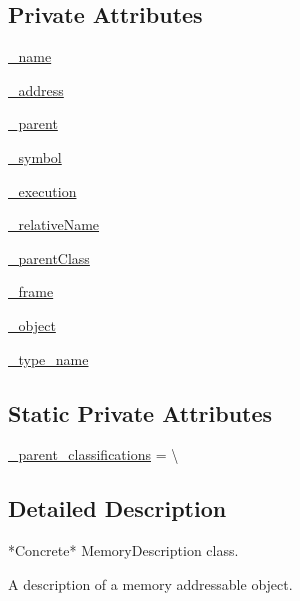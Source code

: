 \subsection*{Private Attributes}
\begin{DoxyCompactItemize}
\item 
\hyperlink{classmemoryoracle_1_1descriptions_1_1MemoryDescription_a230aae12304394f735d52002227c7705}{\+\_\+name}
\item 
\hyperlink{classmemoryoracle_1_1descriptions_1_1MemoryDescription_a06750833f49f1de99914f927c534d997}{\+\_\+address}
\item 
\hyperlink{classmemoryoracle_1_1descriptions_1_1MemoryDescription_a1ac34a11871a96eeff4f8285e0ad3a66}{\+\_\+parent}
\item 
\hyperlink{classmemoryoracle_1_1descriptions_1_1MemoryDescription_a6857ccb0a28dc478c8da23457b55f7d7}{\+\_\+symbol}
\item 
\hyperlink{classmemoryoracle_1_1descriptions_1_1MemoryDescription_ae48342721625d8c170df2c5dd2d73ec3}{\+\_\+execution}
\item 
\hyperlink{classmemoryoracle_1_1descriptions_1_1MemoryDescription_aabeba1644723470428b1aeb30a20e554}{\+\_\+relative\+Name}
\item 
\hyperlink{classmemoryoracle_1_1descriptions_1_1MemoryDescription_a56f034c13ee367338d69fd438b7182bf}{\+\_\+parent\+Class}
\item 
\hyperlink{classmemoryoracle_1_1descriptions_1_1MemoryDescription_a59379998949382c2cda446d79fe1065b}{\+\_\+frame}
\item 
\hyperlink{classmemoryoracle_1_1descriptions_1_1MemoryDescription_a7c1195476ceb85c2e72765ed30f44eca}{\+\_\+object}
\item 
\hyperlink{classmemoryoracle_1_1descriptions_1_1MemoryDescription_a340a0f8c90bf3c2d80323327d706ee1b}{\+\_\+type\+\_\+name}
\end{DoxyCompactItemize}
\subsection*{Static Private Attributes}
\begin{DoxyCompactItemize}
\item 
\hyperlink{classmemoryoracle_1_1descriptions_1_1MemoryDescription_a9b09a20927902bb9e26d1ce27ad99822}{\+\_\+parent\+\_\+classifications} = \textbackslash{}
\end{DoxyCompactItemize}


\subsection{Detailed Description}
\begin{DoxyVerb}*Concrete* MemoryDescription class.

A description of a memory addressable object.
\end{DoxyVerb}
 

